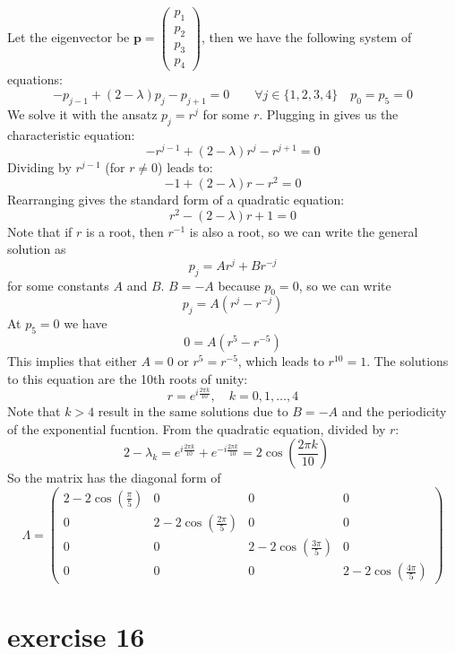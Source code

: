 \documentclass{article}
\begin{document}
Let the eigenvector be $\mathbf{p} = \begin{pmatrix} p_1 \\ p_2 \\ p_3 \\ p_4 \end{pmatrix}$, then we have the following system of equations:
\[ - {p_{j - 1}} + \left( {2 - \lambda } \right){p_j} - {p_{j + 1}} = 0\qquad \forall j \in \{ 1,2,3,4\} \quad {p_0} = {p_5} = 0\]
We solve it with the ansatz $p_j = r^j$ for some $r$. Plugging in gives us the characteristic equation:
\[ - r^{j-1} + (2 - \lambda) r^j - r^{j+1} = 0 \]
Dividing by $r^{j-1}$ (for $r \neq 0$) leads to:
\[ - 1 + (2 - \lambda) r - r^2 = 0 \]
Rearranging gives the standard form of a quadratic equation:
\[ r^2 - (2 - \lambda) r + 1 = 0 \]
Note that if $r$ is a root, then $r^{-1}$ is also a root, so we can write the general solution as
\[ p_j = A r^j + B r^{-j} \]
for some constants $A$ and $B$. $B=-A$ because $p_0 = 0$, so we can write
\[ p_j = A \left( r^j - r^{-j} \right) \]
At $p_5  =0$ we have
\[ 0 = A \left( r^5 - r^{-5} \right) \]
This implies that either $A = 0$ or $r^5 = r^{-5}$, which leads to $r^{10} = 1$. The solutions to this equation are the 10th roots of unity:
\[ r = e^{i\frac{2\pi k}{10}}, \quad k = 0, 1, \ldots, 4 \]
Note that $k>4$ result in the same solutions due to $B=-A$ and the periodicity of the exponential fucntion. From the quadratic equation, divided by $r$:
\[2-\lambda_k = e^{i\frac{2\pi k}{10}} + e^{-i\frac{2\pi k}{10}} = 2 \cos\left(\frac{2\pi k}{10}\right)\quad \]
So the matrix has the diagonal form of
\[
    \Lambda = \begin{pmatrix}
        2 - 2\cos\left(\frac{\pi}{5}\right) & 0                                    & 0                                    & 0                                    \\
        0                                   & 2 - 2\cos\left(\frac{2\pi}{5}\right) & 0                                    & 0                                    \\
        0                                   & 0                                    & 2 - 2\cos\left(\frac{3\pi}{5}\right) & 0                                    \\
        0                                   & 0                                    & 0                                    & 2 - 2\cos\left(\frac{4\pi}{5}\right)
    \end{pmatrix}
\]

\section{exercise 16}
\end{document}
